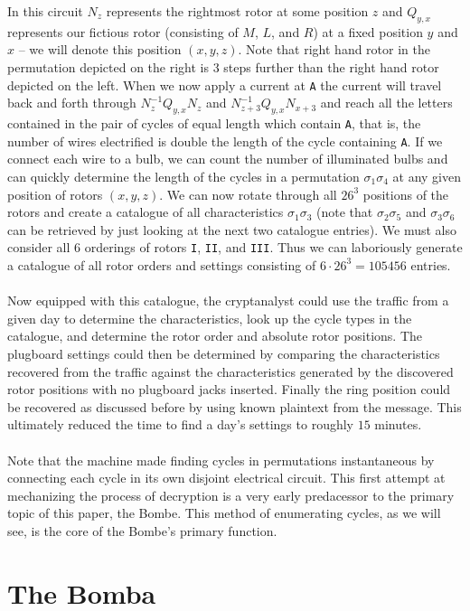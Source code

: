 In this circuit $N_z$ represents the rightmost rotor at some position
$z$ and $Q_{y,x}$ represents our fictious rotor (consisting of $M$,
$L$, and $R$) at a fixed position $y$ and $x$ -- we will denote this
position $(x,y,z)$. Note that right hand
rotor in the permutation depicted on the right is 3 steps further
than the right hand rotor depicted on the left. When we now apply a
current at \texttt{A} the current will travel back and forth through
$N^{-1}_zQ_{y,x}N_z$ and $N^{-1}_{z+3}Q_{y,x}N_{x+3}$ and reach all
the letters contained
in the pair of cycles of equal length which contain \texttt{A}, that
is, the number of wires electrified is double the length of the cycle
containing \texttt{A}. If we connect each wire to a bulb, we can
count the number of illuminated bulbs and can quickly determine the length of
the cycles in a permutation $\sigma_1\sigma_{4}$ at any given
position of rotors $(x,y,z)$. We can now rotate through all
$26^3$ positions of the rotors and create a catalogue of all
characteristics $\sigma_1\sigma_3$ (note that $\sigma_2\sigma_5$ and
$\sigma_3\sigma_6$ can be retrieved by just looking at the next two
catalogue entries). We must also consider all 6 orderings of rotors
\texttt{I}, \texttt{II}, and \texttt{III}. Thus we can laboriously
generate a catalogue of all rotor orders and settings consisting of
$6\cdot 26^3 = 105456$ entries.
\\\\Now equipped with this catalogue, the cryptanalyst could use the
traffic from a given day to determine the characteristics, look up
the cycle types in the catalogue, and determine the rotor order and
absolute rotor positions. The plugboard settings could then be
determined by comparing the characteristics recovered from the
traffic against the characteristics generated by the discovered rotor
positions with no plugboard jacks inserted. Finally the ring position
could be recovered as discussed before by using known plaintext from
the message. This ultimately reduced the time to find a day's
settings to roughly $15$ minutes.
\\\\Note that the machine made finding cycles in permutations
instantaneous by connecting each cycle in its own disjoint electrical
circuit. This first attempt at mechanizing the process of decryption
is a very early predacessor to the primary topic of this paper, the
Bombe. This method of enumerating cycles, as we will see, is the core
of the Bombe's primary function.
\section{The Bomba}


